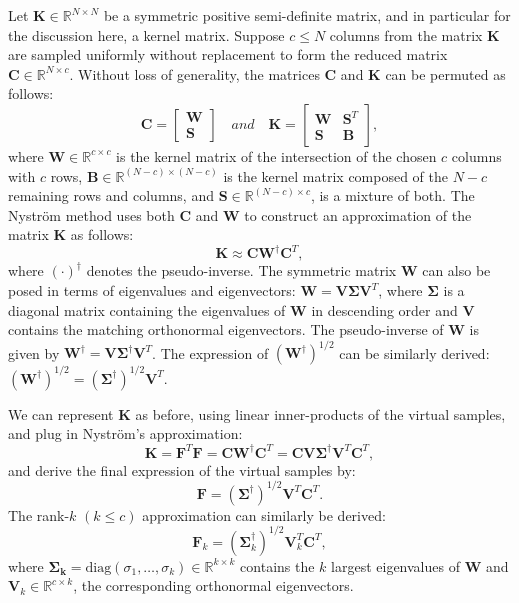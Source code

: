 \documentclass[journal]{IEEEtran}
\newcommand{\bK}{\mathbf{K}}
\newcommand{\bF}{\mathbf{F}}
\newcommand{\bC}{\mathbf{C}}
\newcommand{\bW}{\mathbf{W}}
\newcommand{\bS}{\mathbf{S}}
\newcommand{\bB}{\mathbf{B}}
\newcommand{\bV}{\mathbf{V}}
\begin{document}
Let $\bK \in \mathbb{R}^{N \times N}$ be a symmetric positive semi-definite matrix, and in particular for the discussion here, a kernel matrix. Suppose $c \leq N$ columns from the matrix $\bK$ are sampled uniformly without replacement to form the reduced matrix $\bC \in \mathbb{R}^{N \times c}$. Without loss of generality, the matrices $\bC$ and $\bK$ can be permuted as follows:
\begin{equation}\label{eq:NystromMatrixDecomp}
    \bC =
    \begin{bmatrix}
    \bW \\
    \bS
    \end{bmatrix}
    \quad and \quad
    \bK =
    \begin{bmatrix}
    \bW & \bS^T \\
    \bS & \bB
    \end{bmatrix},
\end{equation}
where $\bW \in \mathbb{R}^{c \times c}$ is the kernel matrix of the intersection of the chosen $c$ columns with $c$ rows, $\bB \in \mathbb{R}^{(N-c)\times (N-c)}$ is the kernel matrix composed of the $N-c$ remaining rows and columns, and $\bS \in \mathbb{R}^{(N-c) \times c}$, is a mixture of both.
The Nystr\"{o}m method uses both $\bC$ and $\bW$ to construct an approximation of the matrix $\bK$ as follows:
\begin{equation}\label{eq:Nystrom}
\bK \approx \bC \bW^{\dagger} \bC^T,
\end{equation}
where $(\cdot)^{\dagger}$ denotes the pseudo-inverse. The symmetric matrix $\bW$ can also be posed in terms of eigenvalues and eigenvectors: $\bW=\bV \boldsymbol{\Sigma} \bV^T$, where $\boldsymbol{\Sigma}$ is a diagonal matrix containing the eigenvalues of $\bW$ in descending order and $\bV$ contains the matching orthonormal eigenvectors. The pseudo-inverse of $\bW$ is given by $\bW^{\dagger}=\bV \boldsymbol{\Sigma}^{\dagger} \bV^T$. The expression of $(\bW^{\dagger})^{1/2}$ can be similarly derived: $(\bW^{\dagger})^{1/2}=(\boldsymbol{\Sigma}^{\dagger})^{1/2}\bV^T$.

We can represent $\bK$ as before, using linear inner-products of the virtual samples, and plug in Nystr\"{o}m's approximation:
\begin{equation}\label{eq:Nystrom2}
\bK = \bF^T \bF = \bC \bW^{\dagger} \bC^T = \bC \bV \boldsymbol{\Sigma}^{\dagger} \bV^T \bC^T,
\end{equation}
and derive the final expression of the virtual samples by:
\begin{equation}\label{eq:Nystrom3}
\bF = (\boldsymbol{\Sigma}^{\dagger})^{1/2} \bV^T \bC^T.
\end{equation}
The rank-$k$ $(k \leq c)$ approximation can similarly be derived:
\begin{equation}\label{eq:VirtualSamplesConcluded}
     \bF_k = \left(\boldsymbol{\Sigma}_k^{\dagger} \right)^{1/2} \mathbf{V}_k^T \bC^T,
\end{equation}
where $\boldsymbol{\Sigma_k}=\text{diag}(\sigma_1,\ldots,\sigma_k) \in \mathbb{R}^{k \times k}$ contains the $k$ largest eigenvalues of $\bW$ and $\bV_k \in \mathbb{R}^{c \times k}$, the corresponding orthonormal eigenvectors.
\end{document}
